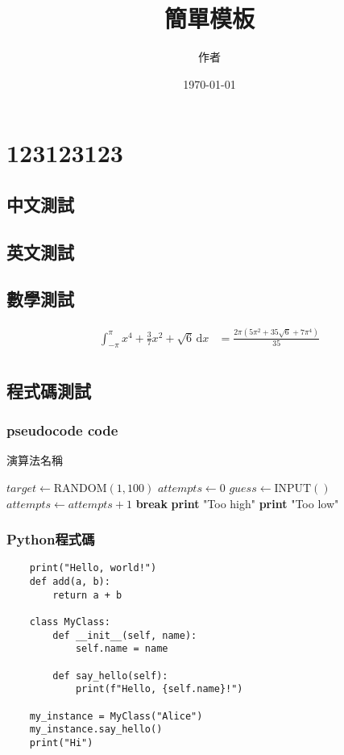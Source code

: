 \documentclass[12pt, oneside]{book}
\title{簡單模板}
\author{作者}
\date{\today}
\begin{document}
\maketitle
\tableofcontents

\chapter{123123123}
\section{中文測試}
\zhlipsum[1]
\section{英文測試}
\lipsum[1]
\section{數學測試}
\begin{align}
	\int_{-\pi }^{\pi } x^{4} + \frac{3}{7}x^2 + \sqrt{6}   \,\mathrm{d}x & = \frac{2 \pi (5 \pi^{2} + 35 \sqrt{6} + 7 \pi^{4})}{35} \\
\end{align}
\section{程式碼測試}
\subsection{pseudocode code}
\begin{algorithm}
	\caption{演算法名稱}
	\begin{algorithmic}[1]
		\State \(target \gets \text{RANDOM}(1, 100) \)
		\State \(attempts \gets 0\)
		\State \(guess \gets \text{INPUT}() \)
		\State \(attempts \gets attempts + 1\)
		\State \textbf{break}
		\State \textbf{print} "Too high"
		\Else
		\State \textbf{print} "Too low"
		\EndIf
		\EndWhile
	\end{algorithmic}
\end{algorithm}

\subsection{Python程式碼}
\begin{verbatim}
    print("Hello, world!")
    def add(a, b):
        return a + b

    class MyClass:
        def __init__(self, name):
            self.name = name

        def say_hello(self):
            print(f"Hello, {self.name}!")

    my_instance = MyClass("Alice")
    my_instance.say_hello()
    print("Hi")
\end{verbatim}
\end{document}
